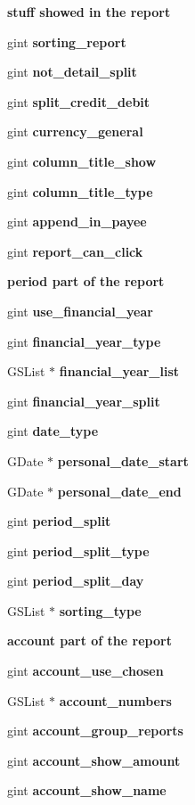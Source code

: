 \begin{Indent}{\bf stuff showed in the report}\par
{\em \label{_amgrp573712d5aab0cb31b67871389062a27a}
 }\begin{DoxyCompactItemize}
\item 
gint {\bf sorting\_\-report}
\item 
gint {\bf not\_\-detail\_\-split}
\item 
gint {\bf split\_\-credit\_\-debit}
\item 
gint {\bf currency\_\-general}
\item 
gint {\bf column\_\-title\_\-show}
\item 
gint {\bf column\_\-title\_\-type}
\item 
gint {\bf append\_\-in\_\-payee}
\item 
gint {\bf report\_\-can\_\-click}
\end{DoxyCompactItemize}
\end{Indent}
\begin{Indent}{\bf period part of the report}\par
{\em \label{_amgrpfd1248743374f92ec71b4f68ab564e3a}
 }\begin{DoxyCompactItemize}
\item 
gint {\bf use\_\-financial\_\-year}
\item 
gint {\bf financial\_\-year\_\-type}
\item 
GSList $\ast$ {\bf financial\_\-year\_\-list}
\item 
gint {\bf financial\_\-year\_\-split}
\item 
gint {\bf date\_\-type}
\item 
GDate $\ast$ {\bf personal\_\-date\_\-start}
\item 
GDate $\ast$ {\bf personal\_\-date\_\-end}
\item 
gint {\bf period\_\-split}
\item 
gint {\bf period\_\-split\_\-type}
\item 
gint {\bf period\_\-split\_\-day}
\item 
GSList $\ast$ {\bf sorting\_\-type}
\end{DoxyCompactItemize}
\end{Indent}
\begin{Indent}{\bf account part of the report}\par
{\em \label{_amgrpf46aef3bb2f8b79e439534849c123ee3}
 }\begin{DoxyCompactItemize}
\item 
gint {\bf account\_\-use\_\-chosen}
\item 
GSList $\ast$ {\bf account\_\-numbers}
\item 
gint {\bf account\_\-group\_\-reports}
\item 
gint {\bf account\_\-show\_\-amount}
\item 
gint {\bf account\_\-show\_\-name}
\end{DoxyCompactItemize}
\end{Indent}
